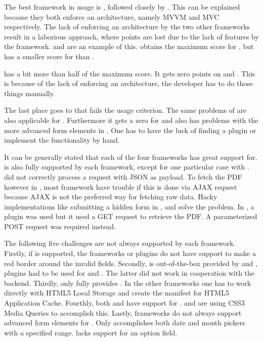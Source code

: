 \documentclass[a4paper]{artikel3}
\begin{document}
The best framework in usage is \kendoa{}, followed closely by \sta{}.
This can be explained because they both enforce an architecture, namely MVVM and MVC respectively.
The lack of enforcing an architecture by the two other frameworks result in a laborious approach, where points are lost due to the lack of features by the framework.
 and  are an example of this.
\kendoa{} obtains the maximum score for , but has a smaller score for  than \sta.

\jqma{} has a bit more than half of the maximum score.
It gets zero points on  and .
This is because of the lack of enforcing an architecture, the developer has to do those things manually. 

The last place goes to \lungo{} that fails the usage criterion.
The same problems of \jqma{} are also applicable for \lungo{}.
Furthermore it gets a zero for  and also has problems with the more advanced form elements in .
One has to have the luck of finding a plugin or implement the functionality by hand.

It can be generally stated that each of the four frameworks has great support for.
 is also fully supported by each framework, except for one particular case with \lungo{}.
\quo{} did not correctly process a request with JSON as payload.
To fetch the PDF however in , most framework have trouble if this is done via AJAX request because AJAX is not the preferred way for fetching raw data.
Hacky implementations like submitting a hidden form in \jqma{}, \kendoa{} and \lungo{} solve the problem.
In \sta{}, a plugin was used but it used a GET request to retrieve the PDF.
A parameterized POST request was required instead.

The following five challenges are not always supported by each framework.
Firstly, if  is supported, the frameworks or plugins do not have support to make a red border around the invalid fields.
Secondly,  is out-of-the-box provided by \kendoa{} and \jqma{}, plugins had to be used for \lungo{} and \sta{}.
The latter did not work in cooperation with the backend.
Thirdly, only \sta{} fully provides .
In the other frameworks one has to work directly with HTML5 Local Storage and create the manifest for HTML5 Application Cache.
Fourthly, both \sta{} and \kendoa{} have support for .
\jqma{} and \lungo{} are using CSS3 Media Queries to accomplish this.
Lastly, frameworks do not always support advanced form elements for .
Only \kendoa{} accomplishes both date and month pickers with a specified range.  
\lungo{} lacks support for an option field.
\end{document}
